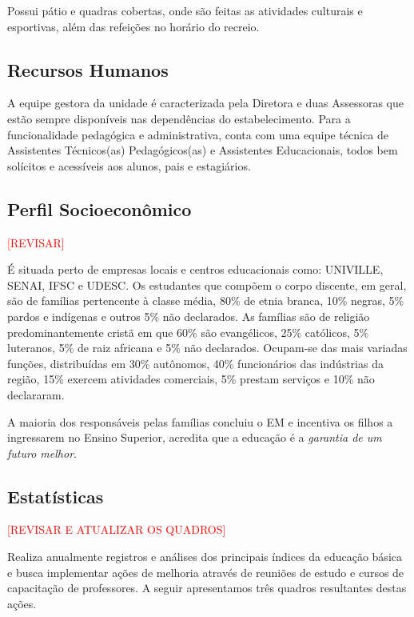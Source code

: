 Possui pátio e quadras cobertas, onde são feitas as atividades culturais e esportivas, além das refeições no horário do recreio.

\subsection{Recursos Humanos} %
\label{sub:Recursos Humanos}
A equipe gestora da unidade é caracterizada pela Diretora e duas Assessoras que estão sempre disponíveis nas dependências do estabelecimento. Para a funcionalidade pedagógica e administrativa, conta com uma equipe técnica de Assistentes Técnicos(as) Pedagógicos(as) e Assistentes Educacionais, todos bem solícitos e acessíveis aos alunos, pais e estagiários.

\subsection{Perfil Socioeconômico} %
\label{sub:Perfil Socioeconômico}
\textcolor{red}{[REVISAR]}

É situada perto de empresas locais e centros educacionais como: UNIVILLE, SENAI, IFSC e UDESC. Os estudantes que compõem o corpo discente, em geral, são de famílias pertencente à classe média, 80\% de etnia branca, 10\% negras, 5\% pardos e indígenas e outros 5\% não declarados. As famílias são de religião predominantemente cristã em que 60\% são evangélicos, 25\% católicos, 5\% luteranos, 5\% de raiz africana e 5\% não declarados. Ocupam-se das mais variadas funções, distribuídas em 30\% autônomos, 40\% funcionários das indústrias da região, 15\% exercem atividades comerciais, 5\% prestam serviços e 10\% não declararam.

A maioria dos responsáveis pelas famílias concluiu o \ac{EM} e incentiva os filhos a ingressarem no Ensino Superior, acredita que a educação é a \emph{garantia de um futuro melhor}. 

\subsection{Estatísticas} %
\label{sub:Estatísticas}
\textcolor{red}{[REVISAR E ATUALIZAR OS QUADROS]}

Realiza anualmente registros e análises dos principais índices da educação básica e busca implementar ações de melhoria através de reuniões de estudo e cursos de capacitação de professores. A seguir apresentamos três quadros resultantes destas ações. 

